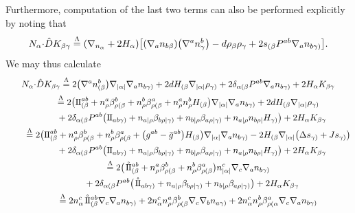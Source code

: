 \documentclass[pdftex]{sigma}
\numberwithin{equation}{section}
\newcommand{\II}{{\rm I\hspace{-.2mm}I}}
\newcommand{\IIo}{\hspace{0.4mm}\mathring{\rm{ I\hspace{-.2mm} I}}{\hspace{.0mm}}}
\newcommand{\hd }{\hat{D}}
\renewcommand{\=}{\stackrel \Lambda =}
\newcommand{\csdot}{\hspace{-0.75mm} \cdot \hspace{-0.75mm}}
\begin{document}
Furthermore, computation of the last two terms can also be performed explicitly by noting that
\[N_{\alpha} \csdot \hd K_{\beta \gamma} \= (\nabla_{n_{\alpha}} + 2 H_{\alpha})\bigl[(\nabla_a n_{b \beta})\bigl(\nabla^a n^b_{\gamma}\bigr) - d \rho_{\beta} \rho_{\gamma} + 2 s_{(\beta} P^{ab} \nabla_a n_{b \gamma)}\bigr] .\]
We may thus calculate
\begin{gather}
N_{\alpha} \csdot \hd K_{\beta \gamma} \= 2\bigl(\nabla^a n^b_{(\beta}\bigr) \nabla_{|\alpha|} \nabla_a n_{b \gamma)} + 2d H_{(\beta} \nabla_{|\alpha|} \rho_{\gamma)} + 2 \delta_{\alpha (\beta} P^{ab} \nabla_a n_{b \gamma)} + 2 H_{\alpha} K_{\beta \gamma} \nonumber\\
\qquad{}\= 2\bigl(\II^{ab}_{(\beta} + n^a_{\rho} \beta^b_{\rho (\beta} + n^b_{\rho} \beta^a_{\rho (\beta} + n^a_{\rho} n^b_{\rho} H_{(\beta}\bigr) \nabla_{|\alpha|} \nabla_a n_{b \gamma)} + 2d H_{(\beta} \nabla_{|\alpha|} \rho_{\gamma)}
\nonumber\\
\qquad\quad{} + 2 \delta_{\alpha (\beta} P^{ab} \bigl(\II_{ab \gamma)} + n_{a |\rho} \beta_{b \rho| \gamma)} + n_{b |\rho} \beta_{a \rho| \gamma)} + n_{a |\rho} n_{b \rho|} H_{\gamma)}\bigr) + 2 H_{\alpha} K_{\beta \gamma} \nonumber\\
\qquad{}\= 2\bigl(\II^{ab}_{(\beta} + n^a_{\rho} \beta^b_{\rho (\beta} + n^b_{\rho} \beta^a_{\rho (\beta} +\bigl(g^{ab} - \bar{g}^{ab}\bigr) H_{(\beta}\bigr) \nabla_{|\alpha|} \nabla_a n_{b \gamma)} - 2 H_{(\beta} \nabla_{|\alpha|} \bigl(\Delta s_{\gamma)} + J s_{\gamma)}\bigr)
\nonumber\\
\qquad\quad{} + 2 \delta_{\alpha (\beta} P^{ab} \bigl(\II_{ab \gamma)} + n_{a |\rho} \beta_{b \rho| \gamma)} + n_{b |\rho} \beta_{a \rho| \gamma)} + n_{a |\rho} n_{b \rho|} H_{\gamma)}\bigr) + 2 H_{\alpha} K_{\beta \gamma} \nonumber\\
\qquad{}\= 2\bigl(\IIo^{ab}_{(\beta} + n^a_{\rho} \beta^b_{\rho (\beta} + n^b_{\rho} \beta^a_{\rho (\beta} \bigr) n^c_{|\alpha|} \nabla_c \nabla_a n_{b \gamma)}
\nonumber\\
\qquad\quad{} + 2 \delta_{\alpha (\beta} P^{ab} \bigl(\IIo_{ab \gamma)} + n_{a |\rho} \beta_{b \rho| \gamma)} + n_{b |\rho} \beta_{a \rho| \gamma)}\bigr) + 2 H_{\alpha} K_{\beta \gamma} \nonumber\\
\qquad{}\= 2n^c_{\alpha} \IIo^{ab}_{(\beta} \nabla_c \nabla_a n_{b \gamma)} + 2 n^c_{\alpha} n^a_{\rho} \beta^b_{\rho (\beta} \nabla_c \nabla_b n_{a \gamma)} + 2 n^c_{\alpha} n^b_{\rho} \beta^a_{\rho (\alpha} \nabla_c \nabla_a n_{b \gamma)}
\nonumber\\

\end{gather}
\end{document}
